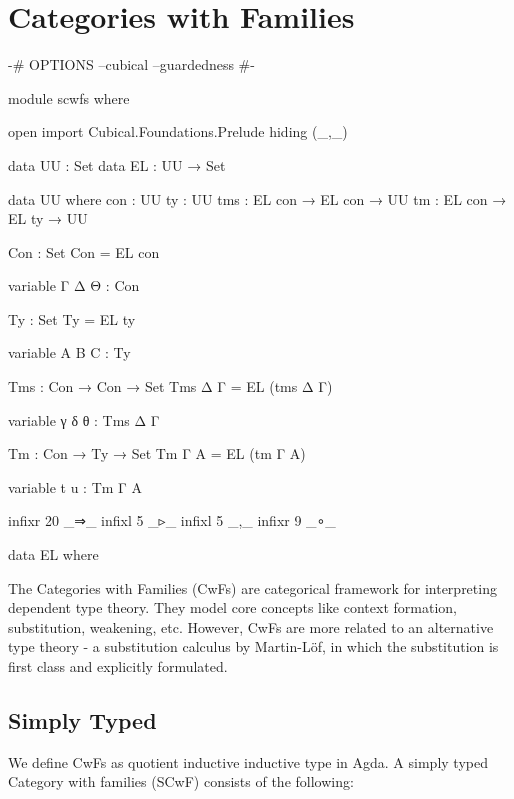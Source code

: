 \section{Categories with Families}

\begin{code}[hide]
{-# OPTIONS --cubical --guardedness #-}

module scwfs where

open import Cubical.Foundations.Prelude hiding (_,_)

data UU : Set
data EL : UU → Set

data UU where
  con : UU
  ty  : UU
  tms : EL con → EL con → UU
  tm  : EL con → EL ty  → UU

Con : Set
Con = EL con

variable Γ Δ Θ : Con

Ty : Set
Ty = EL ty

variable A B C : Ty

Tms : Con → Con → Set
Tms Δ Γ = EL (tms Δ Γ)

variable γ δ θ : Tms Δ Γ

Tm : Con → Ty → Set
Tm Γ A = EL (tm Γ A)

variable t u : Tm Γ A

infixr 20 _⇒_
infixl 5 _▹_
infixl 5 _,_
infixr 9 _∘_

data EL where
\end{code}

The Categories with Families (CwFs) are categorical framework for interpreting dependent type theory. They model core concepts like context formation, substitution, weakening, etc. However, CwFs are more related to an alternative type theory - a substitution calculus by Martin-Löf, in which the substitution is first class and explicitly formulated.

\subsection{Simply Typed}

We define CwFs as quotient inductive inductive type in Agda. A simply typed Category with families (SCwF) consists of the following:

